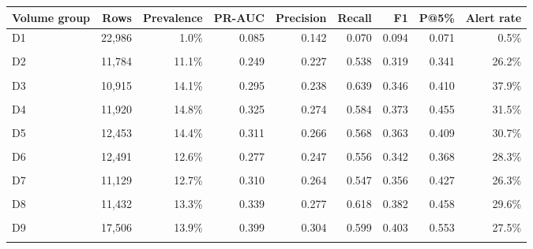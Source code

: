 \begin{tabular}{@{}lrrrrrrrr@{}}
\toprule
Volume group & Rows & Prevalence & PR-AUC & Precision & Recall & F1 & P@5\% & Alert rate \\
\midrule
D1 & 22,986 & 1.0\% & 0.085 & 0.142 & 0.070 & 0.094 & 0.071 & 0.5\% \\\\
D2 & 11,784 & 11.1\% & 0.249 & 0.227 & 0.538 & 0.319 & 0.341 & 26.2\% \\\\
D3 & 10,915 & 14.1\% & 0.295 & 0.238 & 0.639 & 0.346 & 0.410 & 37.9\% \\\\
D4 & 11,920 & 14.8\% & 0.325 & 0.274 & 0.584 & 0.373 & 0.455 & 31.5\% \\\\
D5 & 12,453 & 14.4\% & 0.311 & 0.266 & 0.568 & 0.363 & 0.409 & 30.7\% \\\\
D6 & 12,491 & 12.6\% & 0.277 & 0.247 & 0.556 & 0.342 & 0.368 & 28.3\% \\\\
D7 & 11,129 & 12.7\% & 0.310 & 0.264 & 0.547 & 0.356 & 0.427 & 26.3\% \\\\
D8 & 11,432 & 13.3\% & 0.339 & 0.277 & 0.618 & 0.382 & 0.458 & 29.6\% \\\\
D9 & 17,506 & 13.9\% & 0.399 & 0.304 & 0.599 & 0.403 & 0.553 & 27.5\% \\\\
\bottomrule
\end{tabular}

